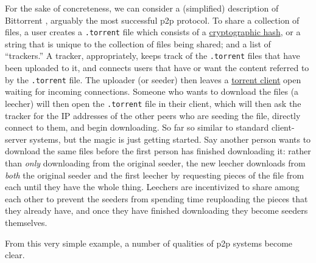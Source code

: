 \documentclass[10pt]{article}
\begin{document}
\begin{multicols}{2}
For the sake of concreteness, we can consider a (simplified) description
of Bittorrent \cite{cohenBitTorrentProtocolSpecification2017} ,
arguably the most successful p2p protocol. To share a collection of
files, a user creates a \texttt{.torrent} file which consists of a
\href{https://en.wikipedia.org/wiki/Cryptographic_hash_function}{cryptographic
hash}, or a string that is unique to the collection of files being
shared; and a list of ``trackers.'' A tracker, appropriately, keeps
track of the \texttt{.torrent} files that have been uploaded to it, and
connects users that have or want the content referred to by the
\texttt{.torrent} file. The uploader (or seeder) then leaves a
\href{https://en.wikipedia.org/wiki/Glossary_of_BitTorrent_terms\#Client}{torrent
client} open waiting for incoming connections. Someone who wants to
download the files (a leecher) will then open the \texttt{.torrent} file
in their client, which will then ask the tracker for the IP addresses of
the other peers who are seeding the file, directly connect to them, and
begin downloading. So far so similar to standard client-server systems,
but the magic is just getting started. Say another person wants to
download the same files before the first person has finished downloading
it: rather than \emph{only} downloading from the original seeder, the
new leecher downloads from \emph{both} the original seeder and the first
leecher by requesting pieces of the file from each until they have the
whole thing. Leechers are incentivized to share among each other to
prevent the seeders from spending time reuploading the pieces that they
already have, and once they have finished downloading they become
seeders themselves.

From this very simple example, a number of qualities of p2p systems
become clear.

\begin{itemize}


\end{itemize}
\end{multicols}
\end{document}
